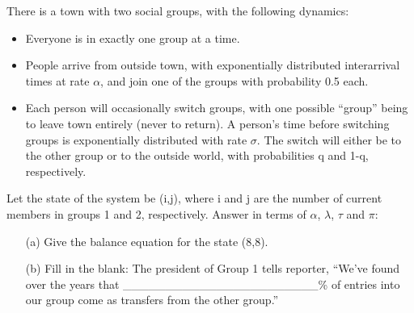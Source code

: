 \oneproblem
There is a town with two social groups, with the following
dynamics:

\begin{itemize}

\item Everyone is in exactly one group at a time.

\item People arrive from outside town, with exponentially distributed
interarrival times at rate $\alpha$, and join one of the groups with
probability 0.5 each.

\item Each person will occasionally switch groups, with one possible ``group''
being to leave town entirely (never to return).  A person's time before
switching groups is exponentially distributed with rate $\sigma$.  The
switch will either be to the other group or to the outside world, with
probabilities q and 1-q, respectively.

\end{itemize}

Let the state of the system be (i,j), where i and j are the number of
current members in groups 1 and 2, respectively.  Answer in terms of
$\alpha$, $\lambda$, $\tau$ and $\pi$:

\begin{itemize}

\item [(a)] Give the balance equation for the state (8,8).


\item [(b)] Fill in the blank:  The president of Group 1 tells reporter,
``We've found over the years that
\_\_\_\_\_\_\_\_\_\_\_\_\_\_\_\_\_\_\_\_\_\_\_\% of entries into our
group come as transfers from the other group.''

\end{itemize}


